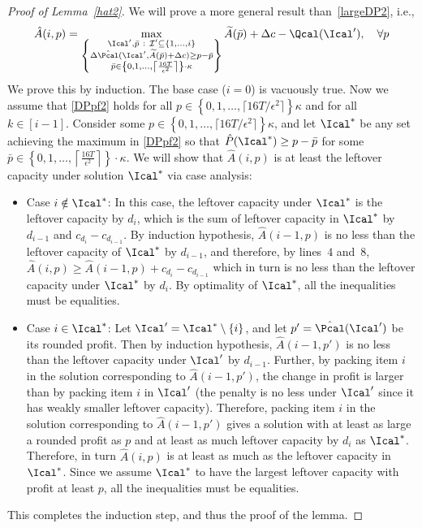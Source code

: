 \begin{proof}[Proof of Lemma~\ref{hat2}]
	We will prove a more general result than~\eqref{largeDP2}, i.e.,
	\begin{align}\label{DPpf2}
	\hat{A}(i,p) = \max_{\left\{\substack{ \Ical',\bar{p}\  : \ 
			\mathcal{I}'\subseteq \{1,\ldots,i\}\\
			\Delta \hat{\Pcal}(\Ical', \widetilde{A}(\bar{p})+\Delta c) \ge p-\bar{p}\\
			\bar{p}\in\left\{ 0, 1, \ldots,\left\lceil\frac{16T}{\epsilon^2}\right\rceil \right\} \cdot \kappa}\right\}} \widetilde{A}(\bar{p})+ \Delta c-\Qcal(\Ical'),\quad \forall p
	\end{align}
	We prove this by induction. The base case ($i=0$) is vacuously true. Now we assume that \eqref{DPpf2} holds for all $p \in \left\{  0, 1, \ldots, \lceil 16T/\epsilon^2 \rceil \right\}  \kappa$ and for all $k \in [i-1]$. Consider some $p \in \left\{  0, 1, \ldots, \lceil 16T/\epsilon^2 \rceil \right\}  \kappa $, and let $\Ical^*$ be any set achieving the maximum in \eqref{DPpf2} so that $\hat{P}(\Ical^*) \ge p-\bar{p}$ for some $\bar{p}\in \left\{ 0, 1, \ldots,\left\lceil\frac{16T}{\epsilon^2}\right\rceil \right\} \cdot \kappa$. We will show that $\hat{A}(i,p)$ is at least the leftover capacity under solution $\Ical^*$ via case analysis:
	\begin{itemize}
		\item Case $i \notin \Ical^*$: In this case, the leftover capacity under $\Ical^*$ is the leftover capacity by $d_i$, which is the sum of leftover capacity in $\Ical^*$ by $d_{i-1}$ and $c_{d_i}-c_{d_{i-1}}$. By induction hypothesis, $\hat{A}(i-1,p)$ is no less than the leftover capacity of $\Ical^*$ by $d_{i-1}$, and therefore, by lines~$4$ and~$8$, $\hat{A}(i,p) \geq \hat{A}(i-1,p) + c_{d_i}-c_{d_{i-1}}$ which in turn is no less than the leftover capacity under $\Ical^*$ by $d_i$. By optimality of $\Ical^*$, all the inequalities must be equalities.
		\item Case $i \in \Ical^*$: Let $\Ical' = \Ical^* \setminus \{ i\}$, and let $p' = \hat{\Pcal}(\Ical')$ be its rounded profit. Then by induction hypothesis, $\hat{A}(i-1,p')$ is no less than the leftover capacity under $\Ical'$ by $d_{i-1}$. Further, by packing item $i$ in the solution corresponding to $\hat{A}(i-1,p')$, the change in profit is larger than by packing item $i$ in $\Ical'$ (the penalty is no less under $\Ical'$ since it has weakly smaller leftover capacity). Therefore, packing item $i$ in the solution corresponding to $\hat{A}(i-1,p')$ gives a solution with at least as large a rounded profit as $p$ and at least as much leftover capacity by $d_i$ as $\Ical^*$. Therefore, in turn $\hat{A}(i,p)$ is at least as much as the leftover capacity in $\Ical^*$. Since we assume $\Ical^*$ to have the largest leftover capacity with profit at least $p$, all the inequalities must be equalities.
	\end{itemize}
	This completes the induction step, and thus the proof of the lemma. 
\end{proof}

